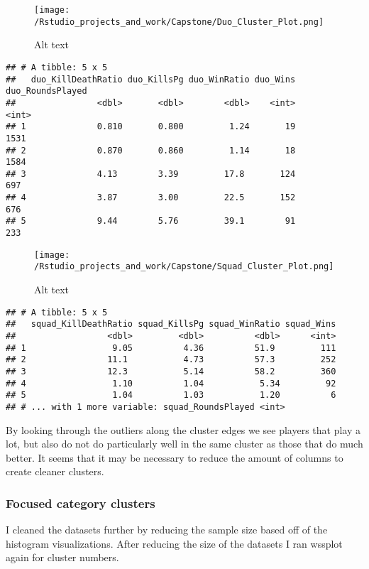\documentclass[]{article}
\begin{document}
\begin{figure}
\centering
\texttt{[image: /Rstudio\_projects\_and\_work/Capstone/Duo\_Cluster\_Plot.png]}
\caption{Alt text}
\end{figure}

\begin{verbatim}
## # A tibble: 5 x 5
##   duo_KillDeathRatio duo_KillsPg duo_WinRatio duo_Wins duo_RoundsPlayed
##                <dbl>       <dbl>        <dbl>    <int>            <int>
## 1              0.810       0.800         1.24       19             1531
## 2              0.870       0.860         1.14       18             1584
## 3              4.13        3.39         17.8       124              697
## 4              3.87        3.00         22.5       152              676
## 5              9.44        5.76         39.1        91              233
\end{verbatim}

\begin{figure}
\centering
\texttt{[image: /Rstudio\_projects\_and\_work/Capstone/Squad\_Cluster\_Plot.png]}
\caption{Alt text}
\end{figure}

\begin{verbatim}
## # A tibble: 5 x 5
##   squad_KillDeathRatio squad_KillsPg squad_WinRatio squad_Wins
##                  <dbl>         <dbl>          <dbl>      <int>
## 1                 9.05          4.36          51.9         111
## 2                11.1           4.73          57.3         252
## 3                12.3           5.14          58.2         360
## 4                 1.10          1.04           5.34         92
## 5                 1.04          1.03           1.20          6
## # ... with 1 more variable: squad_RoundsPlayed <int>
\end{verbatim}

By looking through the outliers along the cluster edges we see players
that play a lot, but also do not do particularly well in the same
cluster as those that do much better. It seems that it may be necessary
to reduce the amount of columns to create cleaner clusters.

\subsubsection{Focused category
clusters}\label{focused-category-clusters}

I cleaned the datasets further by reducing the sample size based off of
the histogram visualizations. After reducing the size of the datasets I
ran wssplot again for cluster numbers.
\end{document}
